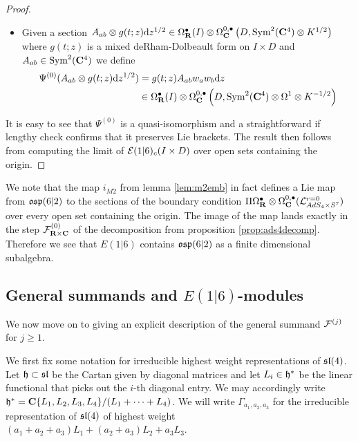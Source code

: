 \documentclass[../main.tex]{subfiles}
\begin{document}
\begin{proof}
\begin{itemize}
\item Given a section 
$A_{ab} \otimes g(t; z)\mathrm{d} z^{1/2} \in \Omega^\bullet_{\mathbf{R}} (I)\otimes \Omega^{0,\bullet}_{\mathbf{C}} \left (D, \text{Sym}^2 (\mathbf{C}^4) \otimes K^{1/2}\right )$ where $g(t;z)$ is a mixed deRham-Dolbeault form on $I\times D$ and $A_{ab} \in \text{Sym}^2 (\mathbf{C}^4)$ we define
\begin{align*}
\Psi^{(0)} (A_{ab} \otimes g(t; z)\mathrm{d} z^{1/2}) &= g(t;z)  A_{ab} w_a w_b \mathrm{d} z \\
&\in \Omega^\bullet_{\mathbf{R}} (I) \otimes \Omega^{0,\bullet}_{\mathbf{C}} \left ( D, \text{Sym}^2 (\mathbf{C}^4) \otimes \Omega^1 \otimes K^{-1/2} \right )
\end{align*}
\end{itemize}
It is easy to see that $\Psi^{(0)}$ is a quasi-isomorphism and a straightforward if lengthy check confirms that it preserves Lie brackets. The result then follows from computing the limit of $\mathcal{E}(1|6)_c (I\times D)$ over open sets containing the origin. 
\end{proof}

\begin{rmk}
We note that the map $i_{M2}$ from lemma \ref{lem:m2emb} in fact defines a Lie map from $\mathfrak{osp}(6|2)$ to the sections of the boundary condition $\Pi \Omega^\bullet_{\mathbf{R}}\otimes \Omega^{0,\bullet}_{\mathbf{C}} (\mathcal{L}^{r=0}_{AdS_4\times S^7} )$ over every open set containing the origin. The image of the map lands exactly in the step $\mathcal{F}^{(0)}_{\mathbf{R}\times \mathbf{C}}$ of the decomposition from proposition \ref{prop:ads4decomp}. Therefore we see that $E(1|6)$ contains $\mathfrak{osp}(6|2)$ as a finite dimensional subalgebra.  
\end{rmk}

\subsection{General summands and $E(1|6)$-modules}
We now move on to giving an explicit description of the general summand $\mathcal{F}^{(j)}$ for $j \geq 1$. 

We first fix some notation for irreducible highest weight representations of $\mathfrak{sl}(4)$. Let $\mathfrak{h}\subset \mathfrak{sl}$ be the Cartan given by diagonal matrices and let $L_i\in \mathfrak{h}^*$ be the linear functional that picks out the $i$-th diagonal entry. We may accordingly write $\mathfrak{h}^* = \mathbf{C} \{L_1, L_2, L_3, L_4\}/(L_1+\cdots + L_4)$. We will write $\Gamma_{a_1,a_2, a_3}$ for the irreducible representation of $\mathfrak{sl}(4)$ of highest weight $(a_1+a_2+a_3)L_1+(a_2+a_3)L_2 + a_3L_3$. 
\end{document}
